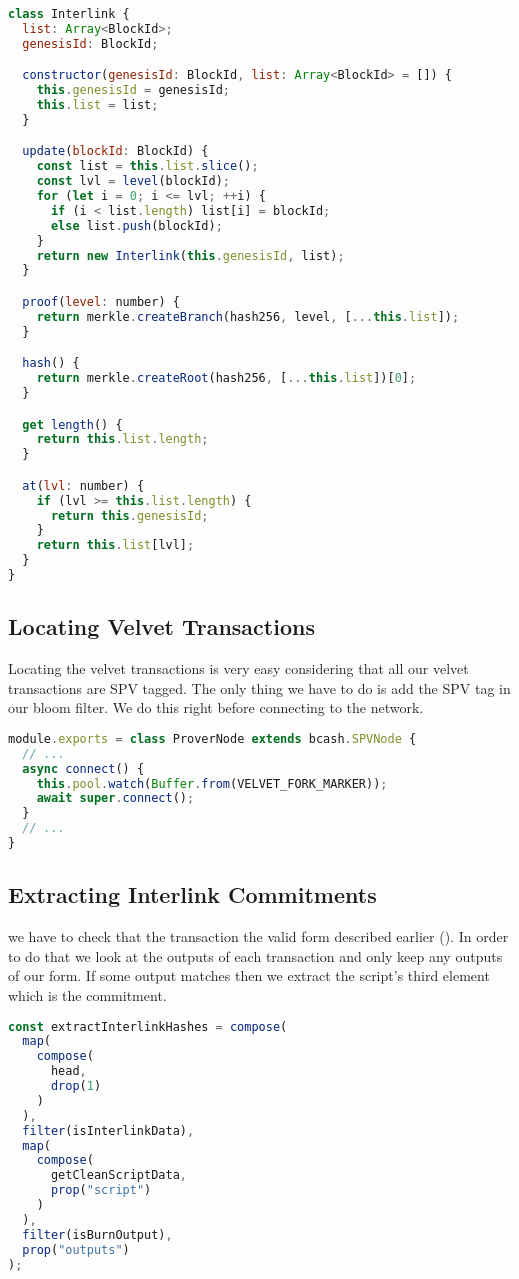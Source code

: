 \begin{lstlisting}[language=Javascript]
class Interlink {
  list: Array<BlockId>;
  genesisId: BlockId;

  constructor(genesisId: BlockId, list: Array<BlockId> = []) {
    this.genesisId = genesisId;
    this.list = list;
  }

  update(blockId: BlockId) {
    const list = this.list.slice();
    const lvl = level(blockId);
    for (let i = 0; i <= lvl; ++i) {
      if (i < list.length) list[i] = blockId;
      else list.push(blockId);
    }
    return new Interlink(this.genesisId, list);
  }

  proof(level: number) {
    return merkle.createBranch(hash256, level, [...this.list]);
  }

  hash() {
    return merkle.createRoot(hash256, [...this.list])[0];
  }

  get length() {
    return this.list.length;
  }

  at(lvl: number) {
    if (lvl >= this.list.length) {
      return this.genesisId;
    }
    return this.list[lvl];
  }
}
\end{lstlisting}

\subsection{Locating Velvet Transactions}
Locating the velvet transactions is very easy considering that all our velvet transactions are SPV tagged. The only thing we have to do is add the SPV tag in our bloom filter. We do this right before connecting to the network.

\begin{lstlisting}[language=Javascript]
module.exports = class ProverNode extends bcash.SPVNode {
  // ...
  async connect() {
    this.pool.watch(Buffer.from(VELVET_FORK_MARKER));
    await super.connect();
  }
  // ...
}
\end{lstlisting}

\subsection{Extracting Interlink Commitments}
we have to check that the transaction the valid form described earlier (). In order to do that we look at the outputs of each transaction and only keep any outputs of our form. If some output matches then we extract the script's third element which is the commitment.

\begin{lstlisting}[language=Javascript]
const extractInterlinkHashes = compose(
  map(
    compose(
      head,
      drop(1)
    )
  ),
  filter(isInterlinkData),
  map(
    compose(
      getCleanScriptData,
      prop("script")
    )
  ),
  filter(isBurnOutput),
  prop("outputs")
);
\end{lstlisting}

